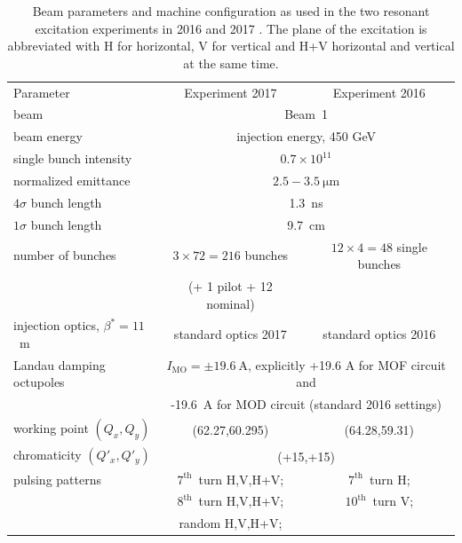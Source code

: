 \documentclass[%
 reprint,
 amsmath,amssymb,
 aps,
prstab,
]{revtex4-1}
\begin{document}
\begin{table}
	\caption{\label{tab:md_param}%
		Beam parameters and machine configuration as used in the two resonant excitation experiments in 2016 and 2017 \cite{resexmd2016,resexmd2017}. The plane of the excitation is abbreviated with H for horizontal, V for vertical and H+V horizontal and vertical at the same time.
	}
	\begin{ruledtabular}
		\begin{tabular}{lcc}
			Parameter & Experiment 2017 & Experiment 2016  \\
			\colrule
			beam &\multicolumn{2}{c}{Beam~1} \\
			beam energy &\multicolumn{2}{c}{injection energy, 450 GeV} \\\hline
			single bunch intensity &\multicolumn{2}{c}{$0.7\times10^{11}$} \\
			normalized emittance &\multicolumn{2}{c}{$2.5-3.5~\mathrm{\mu m}$} \\
			$4\sigma$ bunch length & \multicolumn{2}{c}{1.3~ns}\\
			$1\sigma$ bunch length & \multicolumn{2}{c}{9.7~cm}\\
			number of bunches & $3\times72=216$ bunches & $12\times4=48$ single bunches\\
			& (+ 1 pilot + 12 nominal) & \\\hline
			injection optics, $\beta^*=11$~m & standard optics 2017 & standard optics 2016\\
			Landau damping octupoles  & \multicolumn{2}{c}{$I_{\mathrm{MO}}=\pm19.6~\mathrm{A}$, explicitly +19.6 A for MOF circuit and}\\
			& \multicolumn{2}{c}{-19.6~A for MOD circuit (standard 2016 settings)}\\\hline
			working point $(Q_x,Q_y)$ & (62.27,60.295) & (64.28,59.31)\\
			chromaticity $(Q'_x,Q'_y)$ & \multicolumn{2}{c}{(+15,+15)}\\\hline
			pulsing patterns  & $7^{\mathrm{th}}$~turn H,V,H+V;& $7^{\mathrm{th}}$~turn H;\\
			& $8^{\mathrm{th}}$~turn H,V,H+V;& $10^{\mathrm{th}}$~turn V;\\
			& random  H,V,H+V;& \\
		\end{tabular}
	\end{ruledtabular}
\end{table}
\end{document}
